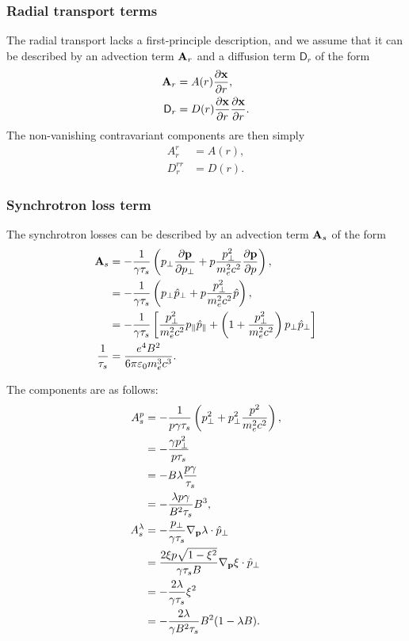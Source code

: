 \documentclass[11pt,a4paper]{article}
\renewcommand{\b}[1]{\ensuremath{ {\bf #1 } }}
\begin{document}
\subsubsection*{Radial transport terms}
The radial transport lacks a first-principle description, and we assume that it can be described by an advection term $\b{A}_r$ and a diffusion term $\mathsf{D}_r$ of the form
\begin{align}
\b{A}_r &= A(r) \frac{\partial \b{x}}{\partial r} , \nonumber \\
\mathsf{D}_r &= D(r)\frac{\partial \b{x}}{\partial r}\frac{\partial \b{x}}{\partial r}.
\end{align}
The non-vanishing contravariant components are then simply
\begin{align}
A_r^r &= A(r), \nonumber \\
D_r^{rr} &= D(r).
\end{align}

\subsubsection*{Synchrotron loss term}
The synchrotron losses can be described by an advection term $\b{A}_s$ of the form
\begin{align}
\b{A}_s &= -\frac{1}{\gamma \tau_s}\left(p_\perp\frac{\partial \b{p}}{\partial p_\perp} + p\frac{p_\perp^2}{m_e^2c^2}\frac{\partial \b{p}}{\partial p}\right), \nonumber \\
&= -\frac{1}{\gamma \tau_s}\left( p_\perp \hat{p}_\perp + p\frac{p_\perp^2}{m_e^2c^2}\hat{p}\right), \nonumber \\
&= -\frac{1}{\gamma\tau_s}\left[ \frac{p_\perp^2}{m_e^2c^2}p_\parallel \hat{p}_\parallel + \left(1+\frac{p_\perp^2}{m_e^2c^2}\right)p_\perp\hat{p}_\perp\right] \nonumber \\
\frac{1}{\tau_s} &= \frac{e^4 B^2}{6\pi\varepsilon_0 m_e^3c^3}.
\end{align}

The components are as follows:
\begin{align}
A_s^p &=    -\frac{1 }{p \gamma\tau_s} \left(  p_\perp^2  + p_\perp^2 \frac{p^2}{m_e^2c^2} \right), \nonumber \\
&= -\frac{ \gamma p_\perp^2}{p \tau_s}\nonumber \\
&=- B\lambda \frac{p \gamma}{\tau_s}\nonumber \\
&= -\frac{\lambda p \gamma}{B^2\tau_s}B^3, \nonumber \\
A_s^\lambda &= -\frac{p_\perp}{\gamma\tau_s} \nabla_\b{p}\lambda\cdot\hat{p}_\perp\nonumber \\
&= \frac{2\xi p\sqrt{1-\xi^2}}{\gamma\tau_s B} \nabla_\b{p} \xi \cdot \hat{p}_\perp \nonumber \\
&= -\frac{2\lambda}{\gamma\tau_s}\xi^2 \nonumber \\
&= -\frac{2\lambda}{\gamma B^2\tau_s} B^2(1-\lambda B). 
\end{align}
\end{document}
